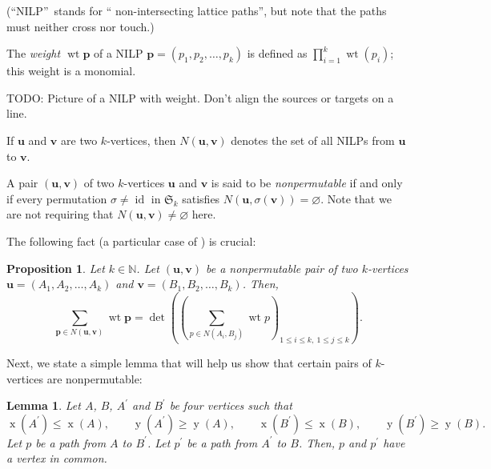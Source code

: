 \documentclass[reqno]{amsart}%
\newcommand{\0}{\phantom{c}}
\let\sumnonlimits\sum
\let\prodnonlimits\prod
\renewcommand{\sum}{\sumnonlimits\limits}
\renewcommand{\prod}{\prodnonlimits\limits}
\newenvironment{verlong}{}{}
\newcommand{\defn}[1]{{\color{darkred}\emph{#1}}}
\theoremstyle{plain}
\newtheorem{lemma}[thm]{Lemma}
\newtheorem{prop}[thm]{Proposition}
\theoremstyle{definition}
\numberwithin{equation}{section}
\begin{document}
(\textquotedblleft NILP\textquotedblright\ stands for \textquotedblleft
non-intersecting lattice paths\textquotedblright, but note that the paths must
neither cross nor touch.)

The \defn{weight $\operatorname{wt}\mathbf{p}$} of a NILP $\mathbf{p}=\left(
p_{1},p_{2},\ldots,p_{k}\right)  $ is defined as $\prod_{i=1}^{k}%
\operatorname*{wt}\left(  p_{i}\right)  $; this weight is a monomial.

TODO: Picture of a NILP with weight. Don't align the sources or targets on a line.

If $\mathbf{u}$ and $\mathbf{v}$ are two $k$-vertices, then
\defn{$N\left( \mathbf{u},\mathbf{v}\right)  $} denotes the set of all NILPs
from $\mathbf{u}$ to $\mathbf{v}$.

\begin{verlong}
A pair $\left(  \mathbf{u},\mathbf{v}\right)  $ of two $k$-vertices
$\mathbf{u}$ and $\mathbf{v}$ is said to be \defn{nonpermutable} if and only
if every permutation $\sigma\neq\operatorname*{id}$ in $\mathfrak{S}_{k}$
satisfies $N\left(  \mathbf{u},\sigma\left(  \mathbf{v}\right)  \right)
=\varnothing$. Note that we are not requiring that $N\left(  \mathbf{u}%
,\mathbf{v}\right)  \neq\varnothing$ here.

The following fact (a particular case of \cite[Corollary 2]{GesVie89}) is crucial:

\begin{prop}
\label{prop.LGV.nonper}Let $k\in\mathbb{N}$. Let $\left(  \mathbf{u}%
,\mathbf{v}\right)  $ be a nonpermutable pair of two $k$-vertices
$\mathbf{u}=\left(  A_{1},A_{2},\ldots,A_{k}\right)  $ and $\mathbf{v}=\left(
B_{1},B_{2},\ldots,B_{k}\right)  $. Then,%
\[
\sum_{\mathbf{p}\in N\left(  \mathbf{u},\mathbf{v}\right)  }\operatorname*{wt}%
\mathbf{p}=\det\left(  \left(  \sum_{p\in N\left(  A_{i},B_{j}\right)
}\operatorname*{wt}p\right)  _{1\leq i\leq k,\ 1\leq j\leq k}\right)  .
\]

\end{prop}

Next, we state a simple lemma that will help us show that certain pairs of
$k$-vertices are nonpermutable:

\begin{lemma}
\label{lem.LGV.hex}Let $A$, $B$, $A^{\prime}$ and $B^{\prime}$ be four
vertices such that%
\[
\operatorname*{x}\left(  A^{\prime}\right)  \leq\operatorname*{x}\left(
A\right)  ,\qquad\operatorname*{y}\left(  A^{\prime}\right)  \geq
\operatorname*{y}\left(  A\right)  ,\qquad\operatorname*{x}\left(  B^{\prime
}\right)  \leq\operatorname*{x}\left(  B\right)  ,\qquad\operatorname*{y}%
\left(  B^{\prime}\right)  \geq\operatorname*{y}\left(  B\right)  .
\]
Let $p$ be a path from $A$ to $B^{\prime}$. Let $p^{\prime}$ be a path from
$A^{\prime}$ to $B$. Then, $p$ and $p^{\prime}$ have a vertex in common.
\end{lemma}


\end{verlong}
\end{document}
